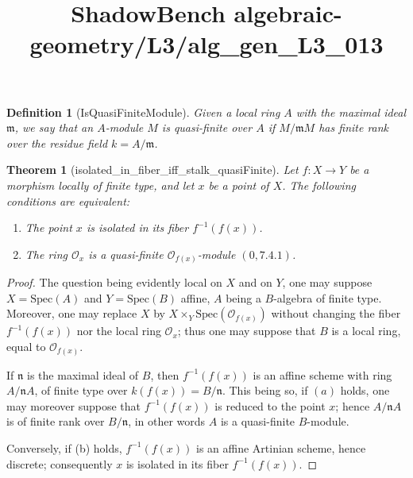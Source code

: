 \documentclass{article}
\title{ShadowBench algebraic-geometry/L3/alg\_gen\_L3\_013}
\newtheorem{theorem}{Theorem}
\newtheorem{definition}{Definition}
\begin{document}
\maketitle

\begin{definition}[IsQuasiFiniteModule] Given a local ring $A$ with the maximal ideal \(\mathfrak{m}\), we say that an \(A\)-module \(M\) is quasi-finite over \(A\) if \(M/\mathfrak{m} M \) has finite rank over the residue field \(k = A/\mathfrak{m}\).
\end{definition}
\begin{theorem}[isolated_in_fiber_iff_stalk_quasiFinite]
Let \(f:X\to Y\) be a morphism locally of finite type, and let \(x\) be a point of \(X\). The following conditions are equivalent:
\begin{enumerate}[label=(\alph*)]
    \item The point \(x\) is isolated in its fiber \(f^{-1}(f(x))\).
    \item The ring \(\mathcal O_x\) is a quasi-finite \(\mathcal O_{f(x)}\)-module \((0,7.4.1)\).
\end{enumerate}
\end{theorem}

\begin{proof}
The question being evidently local on \(X\) and on \(Y\), one may suppose \(X=\mathrm{Spec}(A)\) and \(Y=\mathrm{Spec}(B)\) affine, \(A\) being a \(B\)-algebra of finite type. Moreover, one may replace \(X\) by \(X\times_Y\mathrm{Spec}(\mathcal O_{f(x)})\) without changing the fiber \(f^{-1}(f(x))\) nor the local ring \(\mathcal O_x\); thus one may suppose that \(B\) is a local ring, equal to \(\mathcal O_{f(x)}\).

If \(\mathfrak n\) is the maximal ideal of \(B\), then \(f^{-1}(f(x))\) is an affine scheme with ring \(A/\mathfrak n A\), of finite type over \(k(f(x))=B/\mathfrak n\). This being so, if \((a)\) holds, one may moreover suppose that \(f^{-1}(f(x))\) is reduced to the point \(x\); hence \(A/\mathfrak n A\) is of finite rank over \(B/\mathfrak n\), in other words \(A\) is a quasi-finite \(B\)-module.

Conversely, if (b) holds, \(f^{-1}(f(x))\) is an affine Artinian scheme, hence discrete; consequently \(x\) is isolated in its fiber \(f^{-1}(f(x))\).
\end{proof}
\end{document}
